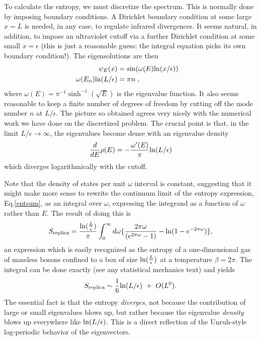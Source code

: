 \documentclass[12pt]{article}
\begin{document}
To calculate the entropy, we must discretize the spectrum. This is normally
done by imposing boundary conditions. A Dirichlet
boundary condition at some large $x=L$ is needed, in any case, to regulate
infrared divergences. It seems natural, in addition, to impose
an ultraviolet cutoff via a further Dirichlet condition at
some small $x=\epsilon$ (this is just a reasonable guess: the integral
equation picks its own boundary condition!). The eigensolutions are then
\begin{align}
\psi_E(x) &= \sin(\omega(E) {\rm ln}(x/\epsilon))\cr
\omega(E_n){\rm ln}(L/\epsilon) &= \pi n ~,
\end{align}
where $\omega(E)=\pi^{-1}\sinh^{-1}(\sqrt{E})$ is the eigenvalue
function. It also seems reasonable to keep a finite number of degrees of
freedom by cutting off the mode number $n$ at $L/\epsilon$. The picture so
obtained agrees very nicely with the numerical work we have done on the
discretized problem. The crucial point is that, in the limit
$L/\epsilon\to\infty$, the eigenvalues become dense with an eigenvalue density
\begin{equation}
{d\over dE} \rho(E) =
    -{\omega^\prime(E)\over\pi}{\rm ln}(L/\epsilon)
\end{equation}
which diverges logarithmically with the cutoff.

Note that the density of
states per unit $\omega$ interval is constant, suggesting that it might
make more sense to rewrite the continuum limit of the entropy expression,
Eq.\ref{entsum}, as an integral over $\omega$, expressing the integrand as
a function of $\omega$ rather than $E$. The result of doing this is
\begin{equation}
S_{{\rm replica}} = {{\rm ln}({L\over\epsilon})\over\pi}\int_0^\infty d\omega
\{
{2\pi\omega\over(e^{2\pi\omega}-1)}-{\rm ln}(1-e^{-2\pi\omega})\},
\label{rindent}
\end{equation}
an expression which is easily recognized as the entropy of a one-dimensional
gas of massless bosons
confined to a box of size ${\rm ln}({L\over\epsilon})$ at a temperature
$\beta=2\pi$.
The integral can be done exactly (see any statistical mechanics text) and
yields
\begin{equation}
	S_{\rm replica}\sim {1\over 6} {\rm ln}(L/\epsilon)~+~O(L^0).
\end{equation}
The essential fact is that the entropy {\it diverges}, not because the
contribution of large or small eigenvalues blows up, but rather because the
eigenvalue {\it density} blows up everywhere like ${\rm ln}(L/\epsilon)$. This
is a direct reflection of the Unruh-style log-periodic behavior of the
eigenvectors.
\end{document}
